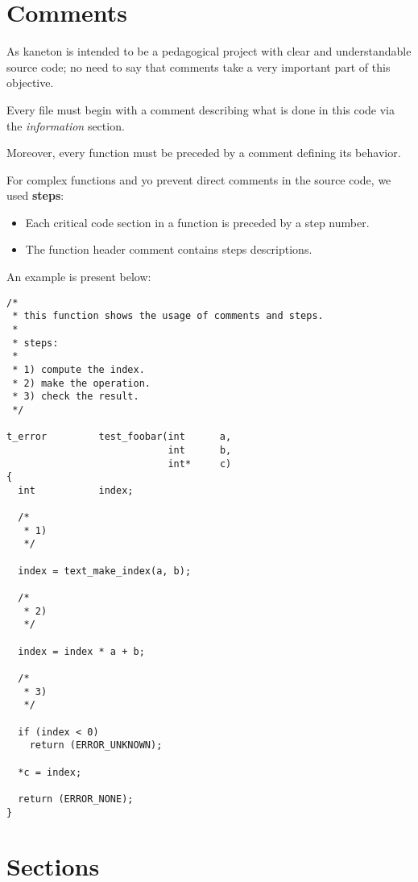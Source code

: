 %
%

\section{Comments}

As kaneton is intended to be a pedagogical project with clear and
understandable source code; no need to say that comments take a very
important part of this objective.

Every file must begin with a comment describing what is done in this
code via the \textit{information} section.

Moreover, every function must be preceded by a comment defining its
behavior.

For complex functions and yo prevent direct comments in the source code,
we used \textbf{steps}:

\begin{itemize}
  \item
    Each critical code section in a function is preceded by a step
    number.
  \item
    The function header comment contains steps descriptions.
\end{itemize}

An example is present below:

\begin{verbatim}
/*
 * this function shows the usage of comments and steps.
 *
 * steps:
 *
 * 1) compute the index.
 * 2) make the operation.
 * 3) check the result.
 */

t_error         test_foobar(int      a,
                            int      b,
                            int*     c)
{
  int           index;

  /*
   * 1)
   */

  index = text_make_index(a, b);

  /*
   * 2)
   */

  index = index * a + b;

  /*
   * 3)
   */

  if (index < 0)
    return (ERROR_UNKNOWN);

  *c = index;

  return (ERROR_NONE);
}
\end{verbatim}

%
%

\section{Sections}

